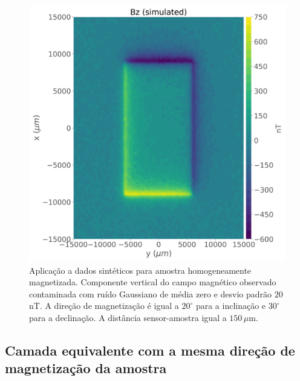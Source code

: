 \begin{figure}
	\centering
	\includegraphics[width=.8\textwidth]{Fig/mag_vec/amostra_homo_correto/noisy_bz_sample.png}
	\caption{Aplicação a dados sintéticos para amostra homogeneamente magnetizada. Componente vertical do campo magnético observado contaminada com ruído Gaussiano de média zero e desvio padrão $20$ nT. A direção de magnetização é igual a $20^\circ$ para a inclinação e $30^\circ$ para a declinação. A distância sensor-amostra igual a $150\, \mu $m. }
	\label{fig:bz_homo_sample}
\end{figure}

\subsection{Camada equivalente com a mesma direção de magnetização da amostra}
\label{subsec:homo_same_dir}

